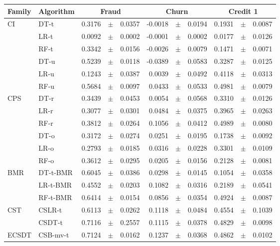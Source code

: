 {\begin{table}[!t]
    \centering
    \footnotesize
    \begin{tabular}{l l r@{\hskip 0in}c@{\hskip 0in}l r@{\hskip 0in}c@{\hskip 0in}l r@{\hskip 
    0in}c@{\hskip 0in}l  } %
    \hline
    \bf{Family} & \bf{Algorithm} & \multicolumn{3}{c}{\bf{Fraud}} & 
    \multicolumn{3}{c}{\bf{Churn}} & \multicolumn{3}{c}{\bf{Credit 1}} \\ 
    \hline
CI&DT-t & 0.3176 &$\pm$& 0.0357 & -0.0018 &$\pm$& 0.0194 & 0.1931 &$\pm$& 0.0087 \\
&LR-t & 0.0092 &$\pm$& 0.0002 & -0.0001 &$\pm$& 0.0002 & 0.0177 &$\pm$& 0.0126 \\
&RF-t & 0.3342 &$\pm$& 0.0156 & -0.0026 &$\pm$& 0.0079 & 0.1471 &$\pm$& 0.0071\\
&DT-u & 0.5239 &$\pm$& 0.0118 & -0.0389 &$\pm$& 0.0583 & 0.3287 &$\pm$& 0.0125 \\
&LR-u & 0.1243 &$\pm$& 0.0387 & 0.0039 &$\pm$& 0.0492 & 0.4118 &$\pm$& 0.0313 \\
&RF-u & 0.5684 &$\pm$& 0.0097 & 0.0433 &$\pm$& 0.0533 & 0.4981 &$\pm$& 0.0079 \\
\hline 
CPS&DT-r & 0.3439 &$\pm$& 0.0453 & 0.0054 &$\pm$& 0.0568 & 0.3310 &$\pm$& 0.0126 \\
&LR-r & 0.3077 &$\pm$& 0.0301 & 0.0484 &$\pm$& 0.0375 & 0.3965 &$\pm$& 0.0263 \\
&RF-r & 0.3812 &$\pm$& 0.0264 & 0.1056 &$\pm$& 0.0412 & 0.4989 &$\pm$& 0.0080 \\
&DT-o & 0.3172 &$\pm$& 0.0274 & 0.0251 &$\pm$& 0.0195 & 0.1738 &$\pm$& 0.0092 \\
&LR-o & 0.2793 &$\pm$& 0.0185 & 0.0316 &$\pm$& 0.0228 & 0.3301 &$\pm$& 0.0109 \\
&RF-o & 0.3612 &$\pm$& 0.0295 & 0.0205 &$\pm$& 0.0156 & 0.2128 &$\pm$& 0.0081 \\
\hline 
BMR&DT-t-BMR & 0.6045 &$\pm$& 0.0386 & 0.0298 &$\pm$& 0.0145 & 0.1054 &$\pm$& 0.0358 \\
&LR-t-BMR & 0.4552 &$\pm$& 0.0203 & 0.1082 &$\pm$& 0.0316 & 0.2189 &$\pm$& 0.0541 \\
&RF-t-BMR & 0.6414 &$\pm$& 0.0154 & 0.0856 &$\pm$& 0.0354 & 0.4924 &$\pm$& 0.0087 \\
\hline 
CST&CSLR-t & 0.6113 &$\pm$& 0.0262 & 0.1118 &$\pm$& 0.0484 & 0.4554 &$\pm$& 0.1039 \\
&CSDT-t & 0.7116 &$\pm$& 0.2557 & 0.1115 &$\pm$& 0.0378 & 0.4829 &$\pm$& 0.0098 \\
\hline 
ECSDT&CSB-mv-t & 0.7124 &$\pm$& 0.0162 & 0.1237 &$\pm$& 0.0368 & 0.4862 &$\pm$& 0.0102 \\

\end{tabular}
\end{table}}
